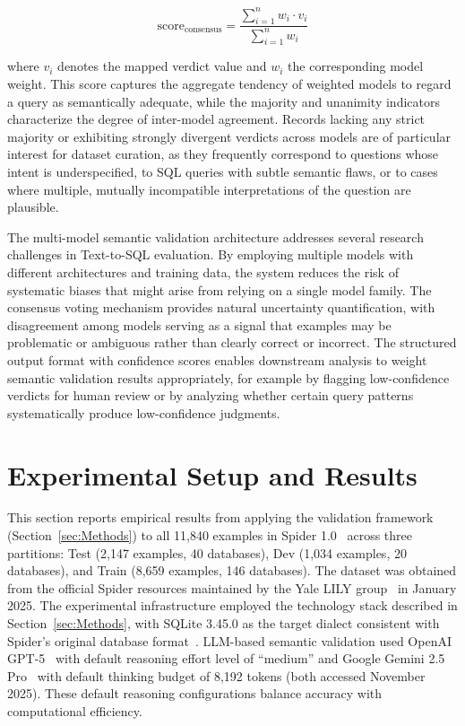 \documentclass[]{einformatica}
\begin{document}
\begin{equation*}
\text{score}_{\text{consensus}} = \frac{\sum_{i=1}^{n} w_i \cdot v_i}{\sum_{i=1}^{n} w_i}
\end{equation*}

where $v_i$ denotes the mapped verdict value and $w_i$ the corresponding model weight. This score captures the aggregate tendency of weighted models to regard a query as semantically adequate, while the majority and unanimity indicators characterize the degree of inter-model agreement. Records lacking any strict majority or exhibiting strongly divergent verdicts across models are of particular interest for dataset curation, as they frequently correspond to questions whose intent is underspecified, to SQL queries with subtle semantic flaws, or to cases where multiple, mutually incompatible interpretations of the question are plausible.

The multi-model semantic validation architecture addresses several research challenges in Text-to-SQL evaluation. By employing multiple models with different architectures and training data, the system reduces the risk of systematic biases that might arise from relying on a single model family. The consensus voting mechanism provides natural uncertainty quantification, with disagreement among models serving as a signal that examples may be problematic or ambiguous rather than clearly correct or incorrect. The structured output format with confidence scores enables downstream analysis to weight semantic validation results appropriately, for example by flagging low-confidence verdicts for human review or by analyzing whether certain query patterns systematically produce low-confidence judgments.

\section{Experimental Setup and Results}\label{sec:Results}

This section reports empirical results from applying the validation framework (Section~\ref{sec:Methods}) to all 11,840 examples in Spider 1.0~\cite{yu2018spider} across three partitions: Test (2,147 examples, 40 databases), Dev (1,034 examples, 20 databases), and Train (8,659 examples, 146 databases). The dataset was obtained from the official Spider resources maintained by the Yale LILY group~\cite{spiderLeaderboard} in January 2025. The experimental infrastructure employed the technology stack described in Section~\ref{sec:Methods}, with SQLite 3.45.0 as the target dialect consistent with Spider's original database format~\cite{yu2018spider,sqliteForeignKeys}. LLM-based semantic validation used OpenAI GPT-5~\cite{openaiModelsDocs} with default reasoning effort level of ``medium'' and Google Gemini 2.5 Pro~\cite{geminiApiDocs} with default thinking budget of 8,192 tokens (both accessed November 2025). These default reasoning configurations balance accuracy with computational efficiency.
\end{document}
